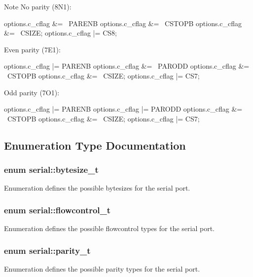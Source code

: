\begin{DoxyNote}{Note}
No parity (8\+N1)\+: \begin{DoxyVerb}options.c_cflag &= ~PARENB
options.c_cflag &= ~CSTOPB
options.c_cflag &= ~CSIZE;
options.c_cflag |= CS8;
\end{DoxyVerb}
 Even parity (7\+E1)\+: \begin{DoxyVerb}options.c_cflag |= PARENB
options.c_cflag &= ~PARODD
options.c_cflag &= ~CSTOPB
options.c_cflag &= ~CSIZE;
options.c_cflag |= CS7;
\end{DoxyVerb}
 Odd parity (7\+O1)\+: \begin{DoxyVerb}options.c_cflag |= PARENB
options.c_cflag |= PARODD
options.c_cflag &= ~CSTOPB
options.c_cflag &= ~CSIZE;
options.c_cflag |= CS7;
\end{DoxyVerb}
 
\end{DoxyNote}


\subsection{Enumeration Type Documentation}
\subsubsection[{\texorpdfstring{bytesize\+\_\+t}{bytesize_t}}]{\setlength{\rightskip}{0pt plus 5cm}enum {\bf serial\+::bytesize\+\_\+t}}\hypertarget{namespaceserial_a00b3281fa11cea770c0b0c8a106080f8}{}\label{namespaceserial_a00b3281fa11cea770c0b0c8a106080f8}
Enumeration defines the possible bytesizes for the serial port. 
\subsubsection[{\texorpdfstring{flowcontrol\+\_\+t}{flowcontrol_t}}]{\setlength{\rightskip}{0pt plus 5cm}enum {\bf serial\+::flowcontrol\+\_\+t}}\hypertarget{namespaceserial_a93ef57a314b4e562f9eded6c15d34351}{}\label{namespaceserial_a93ef57a314b4e562f9eded6c15d34351}
Enumeration defines the possible flowcontrol types for the serial port. 
\subsubsection[{\texorpdfstring{parity\+\_\+t}{parity_t}}]{\setlength{\rightskip}{0pt plus 5cm}enum {\bf serial\+::parity\+\_\+t}}\hypertarget{namespaceserial_a8f45d26bf7c9a06659e75b5004a50481}{}\label{namespaceserial_a8f45d26bf7c9a06659e75b5004a50481}
Enumeration defines the possible parity types for the serial port. 
